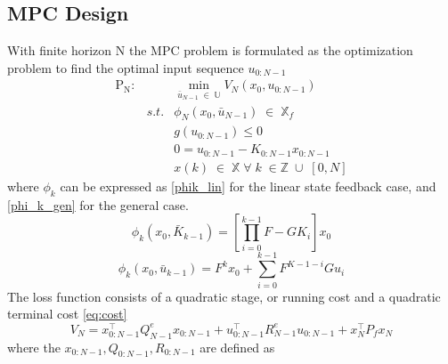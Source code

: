 \subsection{MPC Design}

With finite horizon N the MPC problem is formulated as the optimization problem to find the optimal input sequence $u_{0:N-1}$
\begin{align}\label{mpc_def}
    \mathrm{P_N} : && \min_{\bar u_{N-1} \; \in \; \mathbb{U}} V_N(x_0, u_{0:N-1}) \\
    & s.t.  & \phi_{N}(x_0, \bar u_{N-1}) \; \in \; \mathbb{X}_f\\
    &       & g(u_{0:N-1}) \le 0 \\
    &       & 0 = u_{0:N-1} - K_{0:N-1} x_{0:N-1} \\
    &       & x(k) \; \in \; \mathbb{X} \; \forall \; k \; \in \mathbb{Z} \; \cup \; [0, N]
\end{align}
where $\phi_k$ can be expressed as \autoref{phik_lin} for the linear state feedback case, and \autoref{phi_k_gen} for the general case.  
\begin{equation} \label{phik_lin}
    \phi_k(x_0, \bar K_{k-1}) = \left[\prod_{i=0}^{k-1}F - GK_i \right] x_0 
\end{equation}
\begin{equation} \label{phi_k_gen}
    \phi_k(x_0, \bar u_{k-1}) = F^k x_0 + \sum_{i=0}^{k-1} F^{K-1-i} G u_i
\end{equation}
The loss function consists of a quadratic stage, or running cost and a quadratic terminal cost \autoref{eq:cost}
\begin{equation} \label{eq:cost}
V_N = x_{0:N-1}^\top Q^e_{N-1} x_{0:N-1} + u_{0:N-1}^\top R^e_{N-1} u_{0:N-1} + x_N^\top P_f x_N
\end{equation}
where the $x_{0:N-1}, Q_{0:N-1}, R_{0:N-1}$ are defined as
